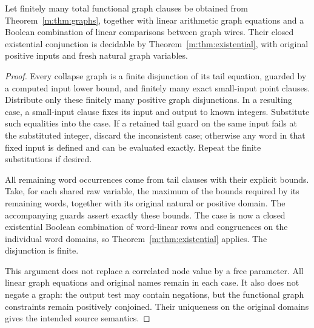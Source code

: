 \begin{lemma}
\label{m:lem:graph-domains}
Let finitely many total functional graph clauses be obtained from
Theorem~\ref{m:thm:graphs}, together with linear arithmetic graph
equations and a Boolean combination of linear comparisons between graph
wires.  Their closed
existential conjunction is decidable by
Theorem~\ref{m:thm:existential}, with original positive inputs and
fresh natural graph variables.
\end{lemma}
\begin{proof}
Every collapse graph is a finite disjunction of its tail equation,
guarded by a computed input lower bound, and finitely many exact
small-input point clauses.  Distribute only these finitely many
positive graph disjunctions.  In a resulting case, a small-input
clause fixes its input and output to known integers.  Substitute such
equalities into the case.  If a retained tail guard on the same input
fails at the substituted integer, discard the inconsistent case;
otherwise any word in that fixed input is defined and can be evaluated
exactly.  Repeat the finite substitutions if desired.

All remaining word occurrences come from tail clauses with their
explicit bounds.  Take, for each shared raw variable, the maximum of
the bounds required by its remaining words, together with its original
natural or positive domain.  The accompanying guards assert exactly
these bounds.  The case is now a closed existential Boolean combination
of word-linear rows and congruences on the individual word domains, so
Theorem~\ref{m:thm:existential} applies.  The disjunction is finite.

This argument does not replace a correlated node value by a free
parameter.  All linear graph equations and original names remain in
each case.  It also does not negate a graph: the output test may contain
negations, but the functional graph constraints remain positively
conjoined.  Their uniqueness on the original domains gives the intended
source semantics.
\end{proof}


